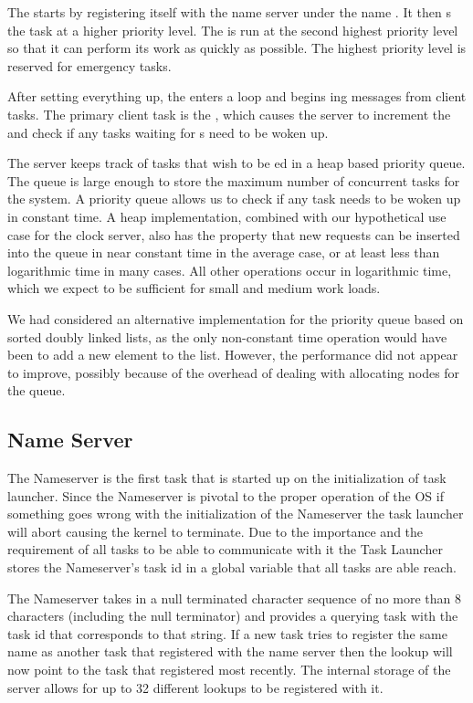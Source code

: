 \documentclass[pdftex,10pt,a4paper]{article}
\begin{document}
The  starts by registering itself with the name
server under the name . It then s the
 task at a higher priority level. The
 is run at the second highest priority level so
that it can perform its work as quickly as possible. The highest
priority level is reserved for emergency tasks.

After setting everything up, the  enters a
 loop and begins ing messages from client
tasks. The primary client task is the , which
causes the server to increment the  and check if any tasks
waiting for s need to be woken up.

The server keeps track of tasks that wish to be ed in a
heap based priority queue. The queue is large enough to store the
maximum number of concurrent tasks for the system. A priority queue
allows us to check if any task needs to be woken up in constant
time. A heap implementation, combined with our hypothetical use case
for the clock server, also has the property that new 
requests can be inserted into the queue in near constant time in the
average case, or at least less than logarithmic time in many
cases. All other operations occur in logarithmic time, which we expect
to be sufficient for small and medium work loads.

We had considered an alternative implementation for the priority queue
based on sorted doubly linked lists, as the only non-constant time
operation would have been to add a new element to the list. However,
the performance did not appear to improve, possibly because of the
overhead of dealing with allocating nodes for the queue.

\subsection*{Name Server}

The Nameserver is the first task that is started up on the
initialization of task launcher. Since the Nameserver is pivotal to
the proper operation of the OS if something goes wrong with the
initialization of the Nameserver the task launcher will abort causing
the kernel to terminate. Due to the importance and the requirement of
all tasks to be able to communicate with it the Task Launcher stores
the Nameserver’s task id in a global variable that all tasks are able
reach.

The Nameserver takes in a null terminated character sequence of no
more than 8 characters (including the null terminator) and provides a
querying task with the task id that corresponds to that string. If a
new task tries to register the same name as another task that
registered with the name server then the lookup will now point to the
task that registered most recently. The internal storage of the server
allows for up to 32 different lookups to be registered with it.
\end{document}
